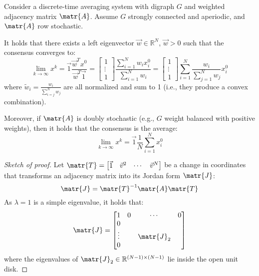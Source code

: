 \begin{theorem}[Consensus] 
    Consider a discrete-time averaging system with digraph $G$ and weighted adjacency matrix $\matr{A}$. Assume $G$ strongly connected and aperiodic, and $\matr{A}$ row stochastic. 
    
    It holds that there exists a left eigenvector $\vec{w} \in \mathbb{R}^N$, $\vec{w} > 0$ such that the consensus converges to:
        \[ 
            \lim_{k \rightarrow \infty} x^k 
            = \vec{1}\frac{\vec{w}^T x^0}{\vec{w}^T\vec{1}} 
            = \begin{bmatrix} 1 \\ \vdots \\ 1 \end{bmatrix} \frac{\sum_{i=1}^N w_i x_i^0}{\sum_{i=1}^N w_i}
            = \begin{bmatrix} 1 \\ \vdots \\ 1 \end{bmatrix} \sum_{i=1}^N \frac{w_i}{\sum_{j=1}^N w_j} x_i^0
        \]
        where $\tilde{w}_i = \frac{w_i}{\sum_{i=j}^N w_j}$ are all normalized and sum to 1 (i.e., they produce a convex combination).

    Moreover, if $\matr{A}$ is doubly stochastic (e.g., $G$ weight balanced with positive weights), then it holds that the consensus is the average:
    \[ 
        \lim_{k \rightarrow \infty} x^k = \vec{1} \frac{1}{N} \sum_{i=1}^N x_i^0
    \]

    \begin{proof}[Sketch of proof]
        Let $\matr{T} = \begin{bmatrix} \vec{1} & \vec{v}^2 & \cdots & \vec{v}^N \end{bmatrix}$ be a change in coordinates that transforms an adjacency matrix into its Jordan form $\matr{J}$:
        \[ \matr{J} = \matr{T}^{-1} \matr{A} \matr{T} \]
        As $\lambda=1$ is a simple eigenvalue, it holds that:
        \[
            \matr{J} = \begin{bmatrix}
                1 & 0 & \cdots & 0 \\
                0 & & &  \\
                \vdots & & \matr{J}_2 &  \\
                0 & & &  \\
            \end{bmatrix}
        \]
        where the eigenvalues of $\matr{J}_2 \in \mathbb{R}^{(N-1) \times (N-1)}$ lie inside the open unit disk.


\end{proof}
\end{theorem}
